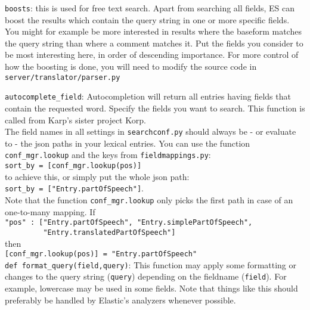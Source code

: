 \documentclass[
12pt, %
a4paper, %
oneside, %
headinclude,footinclude, %
BCOR0mm, %
]{scrartcl}
\begin{document}
  \verb|boosts|: this is used for free text search. Apart from
          searching all fields, ES can boost the results which contain the query
          string in one or more specific fields. You might for example be more interested in
          results where the baseform matches the query string than where a comment
          matches it. Put the fields you consider to be most interesting here, in order of
          descending importance. For more control of how the boosting is done, you will need
          to modify the source code in \verb|server/translator/parser.py|

  \verb|autocomplete_field|: Autocompletion will return all entries having fields that contain the
          requested word. Specify the fields you want to search.
          This function is called from Karp's sister project Korp.
          \\

          The field names in all settings in \verb|searchconf.py| should always
          be - or evaluate to - the json paths in your lexical entries.
          You can use the function
          \verb|conf_mgr.lookup| and the keys from \verb|fieldmappings.py|:\\
          \verb|sort_by = [conf_mgr.lookup(pos)]| \\
          to achieve this, or simply put the whole json path: \\
          \verb|sort_by = ["Entry.partOfSpeech"]|.\\
          Note that the function \verb|conf_mgr.lookup| only picks the first path in case of
          an one-to-many mapping. If \\
          {\verb|"pos" : ["Entry.partOfSpeech", "Entry.simplePartOfSpeech",|\\}
          {\verb|         "Entry.translatedPartOfSpeech"]|\\}
          then\\
          \verb|[conf_mgr.lookup(pos)] = "Entry.partOfSpeech"| \\

  \verb|def format_query(field,query)|: This function may apply some formatting or changes
          to the query string (\verb|query|) depending on the fieldname (\verb|field|).
          For example, lowercase may be used in some fields. Note that things like this
          should preferably be handled by Elastic's analyzers whenever possible.
\end{document}
